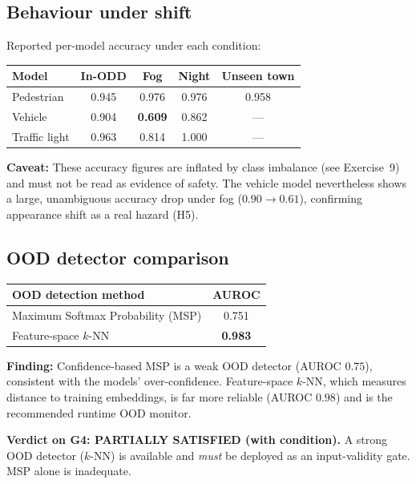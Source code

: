 \documentclass[11pt,a4paper]{article}
\newcommand{\claim}[2]{\vspace{2pt}\noindent\textbf{\color{claimblue}#1:} #2\par\vspace{2pt}}
\begin{document}
\subsection{Behaviour under shift}
Reported per-model accuracy under each condition:

\begin{center}
\begin{tabular}{lcccc}
\toprule
\textbf{Model} & \textbf{In-ODD} & \textbf{Fog} & \textbf{Night} & \textbf{Unseen town} \\
\midrule
Pedestrian     & 0.945 & 0.976 & 0.976 & 0.958 \\
Vehicle        & 0.904 & \textbf{0.609} & 0.862 & --- \\
Traffic light  & 0.963 & 0.814 & 1.000 & --- \\
\bottomrule
\end{tabular}
\end{center}

\claim{Caveat}{These accuracy figures are inflated by class imbalance (see
Exercise~9) and must not be read as evidence of safety. The vehicle model
nevertheless shows a large, unambiguous accuracy drop under fog
($0.90 \rightarrow 0.61$), confirming appearance shift as a real hazard (H5).}

\subsection{OOD detector comparison}
\begin{center}
\begin{tabular}{lc}
\toprule
\textbf{OOD detection method} & \textbf{AUROC} \\
\midrule
Maximum Softmax Probability (MSP) & 0.751 \\
\rowcolor{claimblue!12}
Feature-space $k$-NN              & \textbf{0.983} \\
\bottomrule
\end{tabular}
\end{center}

\claim{Finding}{Confidence-based MSP is a weak OOD detector (AUROC $0.75$),
consistent with the models' over-confidence. Feature-space $k$-NN, which measures
distance to training embeddings, is far more reliable (AUROC $0.98$) and is the
recommended runtime OOD monitor.}

\begin{tcolorbox}[colback=orange!8,colframe=orange!70!black]
\textbf{Verdict on G4: PARTIALLY SATISFIED (with condition).} A strong OOD
detector ($k$-NN) is available and \emph{must} be deployed as an input-validity
gate. MSP alone is inadequate.
\end{tcolorbox}
\end{document}
